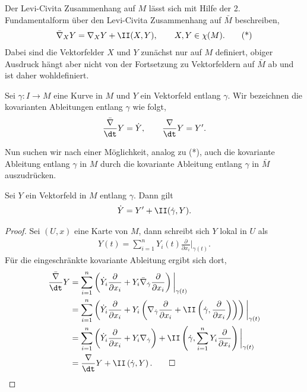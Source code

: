 \documentclass[%
	paper=a5,%
	fleqn,%
	DIV=18,%
	BCOR=0mm,
	fontsize=11pt,
	titlepage=false,%
	bibliography=totoc,
	DIV=18,%
	twoside=true,
	pdftitle=Riemannsche Geometrie,
	pdfauthor=Uwe Semmelmann,
	numbers=noendperiod]%
	{scrbook}
\begin{document}
Der Levi-Civita Zusammenhang auf $M$ lässt sich mit Hilfe der 2. Fundamentalform über den Levi-Civita Zusammenhang auf $\bar{M}$ beschreiben,
\begin{align*}
\bar{\nabla}_{X}Y = \nabla_{X}Y + \II(X,Y),\qquad X,Y\in \chi(M).\tag{*}
\end{align*}
Dabei sind die Vektorfelder $X$ und $Y$ zunächst nur auf $M$ definiert, obiger Ausdruck hängt aber nicht von der Fortsetzung zu Vektorfeldern auf $\bar{M}$ ab und ist daher wohldefiniert.

Sei $\gamma\colon I\to M$ eine Kurve in $M$ und $Y$ ein Vektorfeld entlang $\gamma$. Wir bezeichnen die kovarianten Ableitungen entlang $\gamma$ wie folgt,
\begin{align*}
\frac{\bar{\nabla}}{\dt} Y = \dot{Y},\qquad
\frac{\nabla}{\dt} Y = Y'.
\end{align*}

Nun suchen wir nach einer Möglichkeit, analog zu (*), auch die kovariante Ableitung entlang $\gamma$  in $M$ durch die kovariante Ableitung entlang $\gamma$ in $\bar{M}$ auszudrücken.

\begin{lem}
Sei $Y$ ein Vektorfeld in $M$ entlang $\gamma$. Dann gilt
\begin{align*}
\dot{Y} = Y' + \II(\dot{\gamma},Y).
\end{align*}
\end{lem}
\begin{proof}
Sei $(U,x)$ eine Karte von $M$, dann schreibt sich $Y$ lokal in $U$ als
\begin{align*}
Y(t) = \sum_{i=1}^n Y_{i}(t) \frac{\partial}{\partial x_{i}}\bigg|_{\gamma(t)}.
\end{align*}
Für die eingeschränkte kovariante Ableitung ergibt sich dort,
\begin{align*}
\frac{\bar{\nabla}}{\dt} Y &= 
\sum_{i=1}^n \left( \dot{Y}_{i}\frac{\partial}{\partial x_{i}}
+
Y_{i} \bar{\nabla}_{\dot{\gamma}} \frac{\partial}{\partial x_{i}}\right)\bigg|_{\gamma(t)}\\
&= 
\sum_{i=1}^n \left( \dot{Y}_{i}\frac{\partial}{\partial x_{i}}
+
Y_{i} \left(\nabla_{\dot{\gamma}} \frac{\partial}{\partial x_{i}} + \II\left(\dot{\gamma},\frac{\partial}{\partial x_{i}}\right)\right)\right)\bigg|_{\gamma(t)}\\
&= 
\sum_{i=1}^n \left( \dot{Y}_{i}\frac{\partial}{\partial x_{i}}
+
Y_{i} \nabla_{\dot{\gamma}}\right) + \II \left(\dot{\gamma},\sum_{i=1}^n Y_{i}\frac{\partial}{\partial x_{i}}\right)\bigg|_{\gamma(t)}\\
&= 
\frac{\nabla}{\dt}Y + \II \left(\dot{\gamma},Y\right).\qed
\end{align*}
\end{proof}
\end{document}
